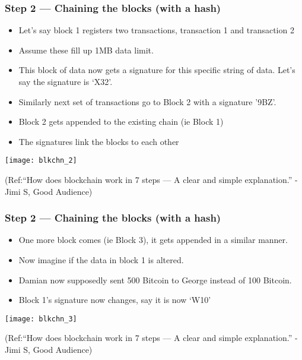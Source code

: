 \begin{frame}[fragile]\frametitle{Step 2 — Chaining the blocks (with a hash)}
\begin{itemize}
\item Let’s say block 1 registers two transactions, transaction 1 and transaction 2
\item Assume these fill up 1MB data limit.
\item This block of data now gets a signature for this specific string of data. Let’s say the signature is ‘X32’.
\item Similarly next set of transactions go to Block 2 with a signature '9BZ'.
\item Block 2 gets appended to the existing chain (ie Block 1) 
\item The signatures link the blocks to each other
\end{itemize}

\begin{center}
\texttt{[image: blkchn\_2]}

{\tiny (Ref:``How does blockchain work in 7 steps — A clear and simple explanation.'' - Jimi S, Good Audience)}
\end{center}

\end{frame}

\begin{frame}[fragile]\frametitle{Step 2 — Chaining the blocks (with a hash)}
\begin{itemize}
\item One more block comes (ie Block 3), it gets appended in a similar manner.
\item Now imagine if the data in block 1 is altered.
\item Damian now supposedly sent 500 Bitcoin to George instead of 100 Bitcoin.
\item Block 1's signature now changes, say it is now ‘W10’
\end{itemize}

\begin{center}
\texttt{[image: blkchn\_3]}

{\tiny (Ref:``How does blockchain work in 7 steps — A clear and simple explanation.'' - Jimi S, Good Audience)}
\end{center}

\end{frame}

